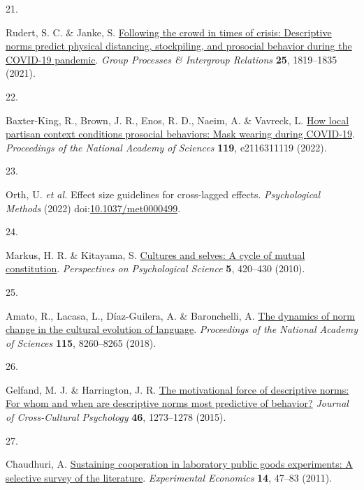 \documentclass[
  man, donotrepeattitle,floatsintext]{apa6}
\newlength{\cslhangindent}
\newlength{\csllabelwidth}
\newlength{\cslentryspacingunit} %
\newenvironment{CSLReferences}[2] %
 {%
  \setlength{\parindent}{0pt}
  \ifodd #1
  \let\oldpar\par
  \def\par{\hangindent=\cslhangindent\oldpar}
  \fi
  \setlength{\parskip}{#2\cslentryspacingunit}
 }%
 {}
\newcommand{\CSLLeftMargin}[1]{\parbox[t]{\csllabelwidth}{#1}}
\newcommand{\CSLRightInline}[1]{\parbox[t]{\linewidth - \csllabelwidth}{#1}\break}
\begin{document}
\begin{CSLReferences}{0}{0}
\leavevmode{}%
\CSLLeftMargin{21. }%
\CSLRightInline{Rudert, S. C. \& Janke, S. \href{https://doi.org/10.1177/13684302211023562}{Following the crowd in times of crisis: Descriptive norms predict physical distancing, stockpiling, and prosocial behavior during the {COVID-19} pandemic}. \emph{Group Processes \& Intergroup Relations} \textbf{25}, 1819--1835 (2021).}

\leavevmode{}%
\CSLLeftMargin{22. }%
\CSLRightInline{Baxter-King, R., Brown, J. R., Enos, R. D., Naeim, A. \& Vavreck, L. \href{https://doi.org/10.1073/pnas.2116311119}{How local partisan context conditions prosocial behaviors: Mask wearing during {COVID-19}}. \emph{Proceedings of the National Academy of Sciences} \textbf{119}, e2116311119 (2022).}

\leavevmode{}%
\CSLLeftMargin{23. }%
\CSLRightInline{Orth, U. \emph{et al.} Effect size guidelines for cross-lagged effects. \emph{Psychological Methods} (2022) doi:\href{https://doi.org/10.1037/met0000499}{10.1037/met0000499}.}

\leavevmode{}%
\CSLLeftMargin{24. }%
\CSLRightInline{Markus, H. R. \& Kitayama, S. \href{https://doi.org/10.1177/1745691610375557}{Cultures and selves: A cycle of mutual constitution}. \emph{Perspectives on Psychological Science} \textbf{5}, 420--430 (2010).}

\leavevmode{}%
\CSLLeftMargin{25. }%
\CSLRightInline{Amato, R., Lacasa, L., Díaz-Guilera, A. \& Baronchelli, A. \href{https://doi.org/10.1073/pnas.1721059115}{The dynamics of norm change in the cultural evolution of language}. \emph{Proceedings of the National Academy of Sciences} \textbf{115}, 8260--8265 (2018).}

\leavevmode{}%
\CSLLeftMargin{26. }%
\CSLRightInline{Gelfand, M. J. \& Harrington, J. R. \href{https://doi.org/10.1177/0022022115600796}{The motivational force of descriptive norms: For whom and when are descriptive norms most predictive of behavior?} \emph{Journal of Cross-Cultural Psychology} \textbf{46}, 1273--1278 (2015).}

\leavevmode{}%
\CSLLeftMargin{27. }%
\CSLRightInline{Chaudhuri, A. \href{https://doi.org/10.1007/s10683-010-9257-1}{Sustaining cooperation in laboratory public goods experiments: A selective survey of the literature}. \emph{Experimental Economics} \textbf{14}, 47--83 (2011).}


\end{CSLReferences}
\end{document}
